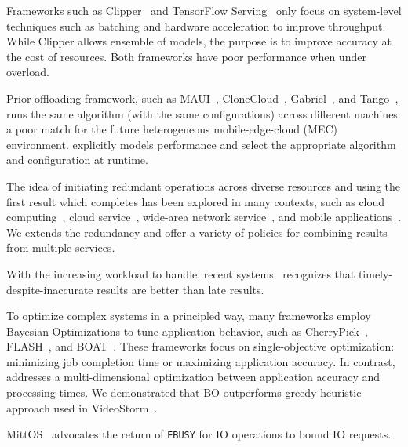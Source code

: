  Frameworks such as Clipper~\cite{crankshaw2017clipper} and
TensorFlow Serving~\cite{tensorflow2017serving} only focus on system-level
techniques such as batching and hardware acceleration to improve
throughput. While Clipper allows ensemble of models, the purpose is to improve
accuracy at the cost of resources. Both frameworks have poor performance when
under overload.

 Prior offloading framework, such as
MAUI~\cite{cuervo2010maui}, CloneCloud~\cite{chun2011clonecloud},
Gabriel~\cite{ha2014towards}, and Tango~\cite{gordon2015accelerating}, runs the
same algorithm (with the same configurations) across different machines: a poor
match for the future heterogeneous mobile-edge-cloud (MEC)
environment. \sysname{} explicitly models performance and select the appropriate
algorithm and configuration at runtime.

 The idea of initiating redundant operations
across diverse resources and using the first result which completes has been
explored in many contexts, such as cloud
computing~\cite{ananthanarayanan2013effective}, cloud
service~\cite{dean2013tail}, wide-area network service~\cite{vulimiri2013low},
and mobile applications~\cite{gordon2015accelerating}. We extends the redundancy
and offer a variety of policies for combining results from multiple services.

 With the increasing workload to handle, recent
systems~\cite{agarwal2013blinkdb, rabkin2014aggregation, zhang2017live}
recognizes that timely-despite-inaccurate results are better than late
results.

 To optimize complex systems in a principled way,
many frameworks employ Bayesian Optimizations to tune application behavior, such
as CherryPick~\cite{alipourfard2017cherrypick}, FLASH~\cite{zhang2016flash}, and
BOAT~\cite{dalibard2017boat}. These frameworks focus on single-objective
optimization: minimizing job completion time or maximizing application
accuracy. In contrast, \sysname{} addresses a multi-dimensional optimization
between application accuracy and processing times. We demonstrated that BO
outperforms greedy heuristic approach used in VideoStorm~\cite{zhang2017live}.

 MittOS~\cite{hao2017mittos} advocates the return of
\texttt{EBUSY} for IO operations to bound IO requests.

